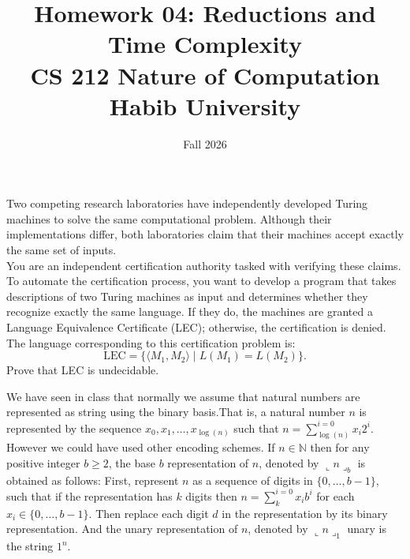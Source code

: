 \documentclass[addpoints]{exam}
\title{Homework 04: Reductions and Time Complexity\\ \vspace{0.5cm} \Large CS 212 Nature of Computation\\Habib University}
\date{Fall 2026}
\newcommand{\classX}[1]{\ensuremath{\text{\textsf{\textbf{#1}}}}}
\newcommand{\classP}{\classX{P}}
\begin{document}
\maketitle

\begin{questions}

    \question[10] Two competing research laboratories have independently developed Turing machines to solve the same computational problem. Although their implementations differ, both laboratories claim that their machines accept exactly the same set of inputs.\\
    You are an independent certification authority tasked with verifying these claims. To automate the certification process, you want to develop a program that takes descriptions of two Turing machines as input and determines whether they recognize exactly the same language. If they do, the machines are granted a Language Equivalence Certificate (LEC); otherwise, the certification is denied. \\
    The language corresponding to this certification problem is:
    \[
    \text{LEC} = \{\langle M_1,M_2\rangle \mid L(M_1)=L(M_2)\}.
    \]
    Prove that LEC is undecidable.
    \begin{solution}
    \end{solution}
    
    \question We have seen in class that normally we assume that natural numbers are represented as string using the binary basis.That is, a natural number $n$ is represented by the sequence $x_0, x_1, \dots, x_{\log(n)}$ such that $n=\sum_{\log(n)}^{i=0}x_i 2^i$. However we could have used other encoding schemes. If $n\in \mathbb{N}$ then for any positive integer $b\geq 2$, the base $b$ representation of $n$, denoted by $\llcorner n \lrcorner_b$ is obtained as follows: First, represent $n$ as a sequence of digits in $\{0,\dots, b-1\}$, such that if the representation has $k$ digits then $n=\sum_{k}^{i=0}x_i b^i$ for each $x_i \in \{0,\dots, b-1\}$. Then replace each digit $d$ in the representation by its binary representation. And the unary representation of $n$, denoted by $\llcorner n \lrcorner_1$ unary is the string $1^n$. 
\end{questions}
\end{document}

